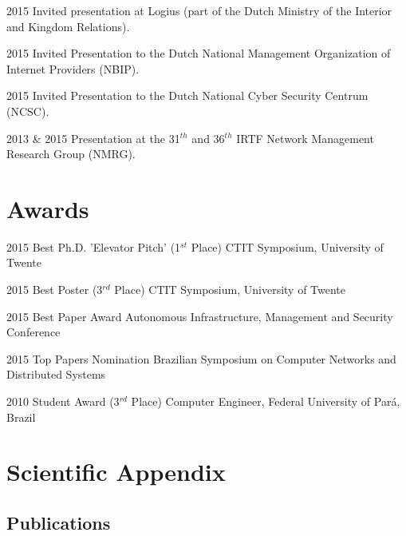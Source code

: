 \documentclass[print]{friggeri-cv} %
\begin{document}
\begin{entrylist}

\vspace{-0.3cm}
\entry
{2015}
{Invited presentation}
{at Logius (part of the Dutch Ministry of the Interior and Kingdom Relations).}

\vspace{-0.3cm}
\entry
{2015}
{Invited Presentation}
{to the Dutch National Management Organization of Internet Providers (NBIP).}

\vspace{-0.3cm}
\entry
{2015}
{Invited Presentation}
{to the Dutch National Cyber Security Centrum (NCSC).}

\vspace{-0.3cm}
\entry
{2013 \& 2015}
{Presentation}
{at the 31$^{th}$ and 36$^{th}$ IRTF Network Management Research Group (NMRG).}

\end{entrylist}

\section{Awards}

\begin{entrylist}
\vspace{-0.3cm}
\entry
{2015}
{Best Ph.D. 'Elevator Pitch' (1$^{st}$ Place)}
{CTIT Symposium, University of Twente}

\vspace{-0.3cm}
\entry
{2015}
{Best Poster (3$^{rd}$ Place)}
{CTIT Symposium, University of Twente}

\vspace{-0.3cm}
\entry
{2015}
{Best Paper Award}
{Autonomous Infrastructure, Management and Security Conference}

\vspace{-0.3cm}
\entry
{2015}
{Top Papers Nomination}
{Brazilian Symposium on Computer Networks and Distributed Systems}

\vspace{-0.3cm}
\entry
{2010}
{Student Award (3$^{rd}$ Place)}
{Computer Engineer, Federal University of Pará, Brazil}

\end{entrylist}


\let\thefootnote\relax{}

\newpage
\section{Scientific Appendix}

\subsection{Publications}

\nocite{*}
\printbibliography[title={\emptyset}]
\end{document}
